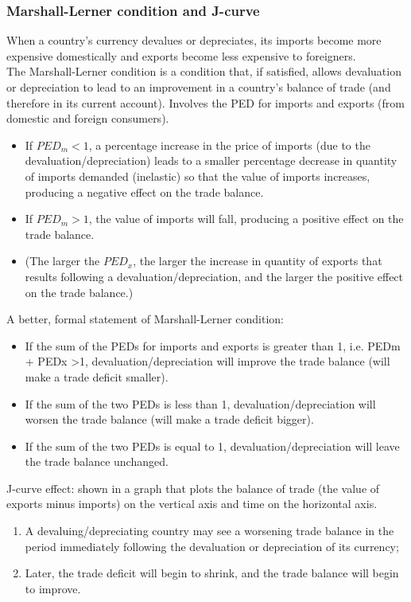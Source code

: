 \documentclass[a4paper,12pt]{article}
\begin{document}
\subsubsection*{Marshall-Lerner condition and J-curve}
When a country's currency devalues or depreciates, its imports become more expensive domestically and exports become less expensive to foreigners.\\
The Marshall-Lerner condition is a condition that, if satisfied, allows devaluation or depreciation to lead to an improvement in a country's balance of trade (and therefore in its current account). Involves the PED for imports and exports (from domestic and foreign consumers).
\begin{itemize}
  \item If $PED_m<1$, a percentage increase in the price of imports (due to the devaluation/depreciation) leads to a smaller percentage decrease in quantity of imports demanded (inelastic) so that the value of imports increases, producing a negative effect on the trade balance.
  \item If $PED_m>1$, the value of imports will fall, producing a positive effect on the trade balance.
  \item (The larger the $PED_x$, the larger the increase in quantity of exports that results following a devaluation/depreciation, and the larger the positive effect on the trade balance.)
\end{itemize}
A better, formal statement of Marshall-Lerner condition:
\begin{itemize}
  \item If the sum of the PEDs for imports and exports is greater than 1, i.e. PEDm + PEDx >1, devaluation/depreciation will improve the trade balance (will make a trade deficit smaller).
  \item If the sum of the two PEDs is less than 1, devaluation/depreciation will worsen the trade balance (will make a trade deficit bigger).
  \item If the sum of the two PEDs is equal to 1, devaluation/depreciation will leave the trade balance unchanged.
\end{itemize}
J-curve effect: shown in a graph that plots the balance of trade (the value of exports minus imports) on the vertical axis and time on the horizontal axis. 
\begin{enumerate}
  \item A devaluing/depreciating country may see a worsening trade balance in the period immediately following the devaluation or depreciation of its currency;
  \item Later, the trade deficit will begin to shrink, and the trade balance will begin to improve.
\end{enumerate}
\end{document}
